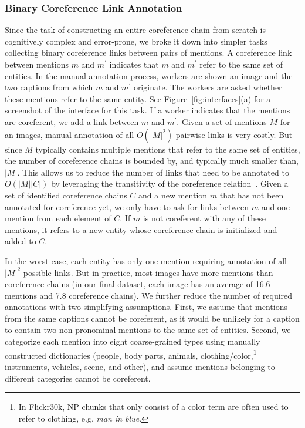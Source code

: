 \documentclass[twocolumn]{svjour3}
\begin{document}
\subsubsection{Binary Coreference Link Annotation}
Since the task of constructing an entire coreference chain from scratch is cognitively complex and error-prone, we broke it down into simpler tasks collecting binary coreference links between pairs of mentions. A coreference link between mentions $m$ and $m^{\prime}$ indicates that $m$ and $m^{\prime}$ refer to the same set of entities. In the manual annotation process, workers are shown an image and the two captions from which $m$ and $m^{\prime}$ originate. The workers are asked whether these mentions refer to the same entity.  See Figure~\ref{fig:interfaces}(a) for a screenshot of the interface for this task. If a worker indicates that the mentions are coreferent, we add a link between $m$ and $m^{\prime}$. Given a set of mentions $M$ for an images, manual annotation of all $O(|M|^{2})$ pairwise links is very costly. But since $M$ typically contains multiple mentions that refer to the same set of entities, the number of coreference chains is bounded by, and typically much smaller than, $|M|$. This allows us to reduce the number of links that need to be annotated to $O(|M||C|)$ by leveraging the transitivity of the coreference relation~\citep{mccarthy1995using}. Given a set of identified coreference chains $C$ and a new mention $m$ that has not been annotated for coreference yet, we only have to ask for links between $m$ and one mention from each element of $C$. If $m$ is not coreferent with any of these mentions, it refers to a new entity whose coreference chain is initialized and added to $C$.

In the worst case, each entity has only one mention requiring annotation of all $|M|^{2}$ possible links. But in practice, most images have more mentions than coreference chains (in our final dataset, each image has an average of 16.6 mentions and 7.8 coreference chains). We further reduce the number of required annotations with two simplifying assumptions.  First, we assume that mentions from the same captions cannot be coreferent, as it would be unlikely for a caption to contain two non-pronominal mentions to the same set of entities. Second, we categorize each mention into eight coarse-grained types using manually constructed dictionaries (people, body parts, animals, clothing/color,\footnote{In Flickr30k, NP chunks that only consist of a color term are often used to refer to clothing, e.g.  \textit{man in blue}.} instruments, vehicles, scene,  and other), and assume mentions belonging to different categories cannot be coreferent. 
\end{document}

